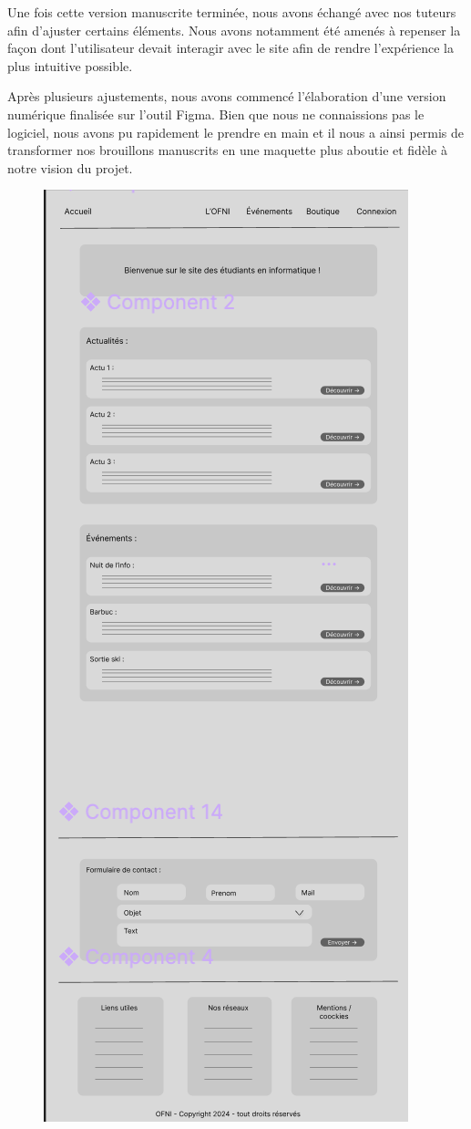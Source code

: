 Une fois cette version manuscrite terminée, nous avons échangé avec nos tuteurs afin d’ajuster certains éléments.
Nous avons notamment été amenés à repenser la façon dont l'utilisateur devait interagir avec le site afin de rendre l'expérience la plus intuitive possible.


Après plusieurs ajustements, nous 
avons commencé l'élaboration d'une version numérique finalisée sur l'outil Figma.
Bien que nous ne connaissions pas le logiciel, nous avons pu rapidement le prendre en main et il nous a ainsi permis de transformer nos brouillons manuscrits en une maquette plus aboutie et fidèle à notre vision du projet.

\begin{figure}[H]
    \centering
    \includegraphics[scale=0.4]{assets/pictures/figma.png}

\end{figure}
